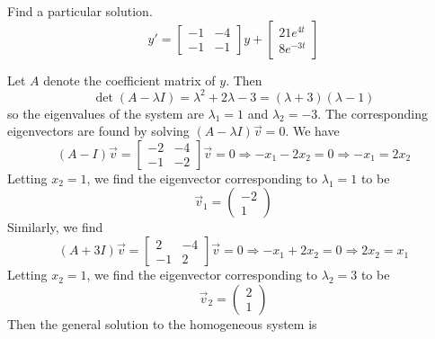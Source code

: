 \documentclass[11pt, titlepage]{article}
\begin{document}
    \begin{problem}[Trench 10.7.1]
        Find a particular solution.
        \[
        y' = 
        \begin{bmatrix}
            -1 & -4 \\
            -1 & -1
        \end{bmatrix}
        y +
        \begin{bmatrix}
            21 e^{4t} \\
            8 e^{-3t}
        \end{bmatrix}
        \]  
    \end{problem}

    \begin{solution}
        Let $A$ denote the coefficient matrix of $y$. Then  
        \[
            \det(A - \lambda I) = \lambda^2 + 2\lambda - 3 = (\lambda + 3)
            (\lambda - 1)
        \] 
        so the eigenvalues of the system are $\lambda_1 = 1$ and $\lambda_2 =
        -3$. The corresponding eigenvectors are found by solving $(A - \lambda
        I)\vec{v} = 0$. We have
        \[
            (A - I) \vec{v} = 
        \begin{bmatrix}
            -2 & -4 \\
            -1 & -2
        \end{bmatrix} \vec{v} = 0 \Longrightarrow -x_1 - 2x_2 = 0
        \Longrightarrow -x_1 = 2x_2
        \] 
        Letting $x_2 = 1$, we find the eigenvector corresponding to $\lambda_1 =
        1$
        to be
        \[
            \vec{v}_1 = 
            \begin{pmatrix}
                -2 \\
                1
            \end{pmatrix}
        \] 
        Similarly, we find
        \[
            (A + 3I)\vec{v} = 
            \begin{bmatrix}
                2 & -4 \\
                -1 & 2
            \end{bmatrix} \vec{v} = 0 \Longrightarrow -x_1 + 2x_2 = 0
            \Longrightarrow 2x_2 = x_1
        \] 
        Letting $x_2 = 1$, we find the eigenvector corresponding to $\lambda_2 =
        3$ to be
        \[
            \vec{v}_2 = 
            \begin{pmatrix}
                2 \\
                1
            \end{pmatrix}
        \] 
        Then the general solution to the homogeneous system is

\end{solution}
\end{document}
